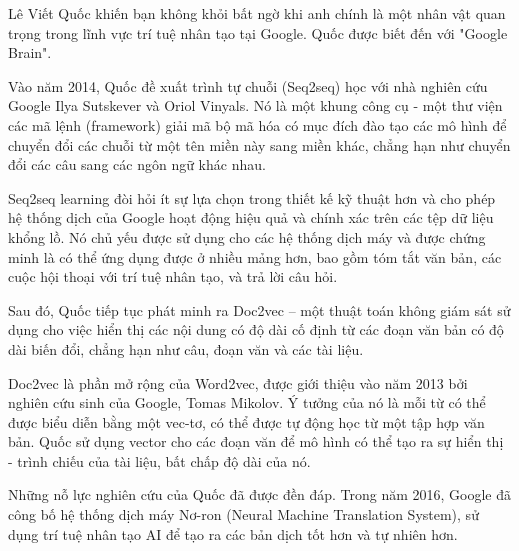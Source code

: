 Lê Viết Quốc khiến bạn không khỏi bất ngờ khi anh chính là một nhân vật quan trọng trong lĩnh vực trí tuệ nhân tạo tại Google. Quốc được biết đến với "Google Brain".

Vào năm 2014, Quốc đề xuất trình tự chuỗi (Seq2seq) học với nhà nghiên cứu Google Ilya Sutskever và Oriol Vinyals. Nó là một khung công cụ - một thư viện các mã lệnh (framework) giải mã bộ mã hóa có mục đích đào tạo các mô hình để chuyển đổi các chuỗi từ một tên miền này sang miền khác, chẳng hạn như chuyển đổi các câu sang các ngôn ngữ khác nhau.

Seq2seq learning đòi hỏi ít sự lựa chọn trong thiết kế kỹ thuật hơn và cho phép hệ thống dịch của Google hoạt động hiệu quả và chính xác trên các tệp dữ liệu khổng lồ. Nó chủ yếu được sử dụng cho các hệ thống dịch máy và được chứng minh là có thể ứng dụng được ở nhiều mảng hơn, bao gồm tóm tắt văn bản, các cuộc hội thoại với trí tuệ nhân tạo, và trả lời câu hỏi.

Sau đó, Quốc tiếp tục phát minh ra Doc2vec – một thuật toán không giám sát sử dụng cho việc hiển thị các nội dung có độ dài cố định từ các đoạn văn bản có độ dài biến đổi, chẳng hạn như câu, đoạn văn và các tài liệu.

Doc2vec là phần mở rộng của Word2vec, được giới thiệu vào năm 2013 bởi nghiên cứu sinh của Google, Tomas Mikolov. Ý tưởng của nó là mỗi từ có thể được biểu diễn bằng một vec-tơ, có thể được tự động học từ một tập hợp văn bản. Quốc sử dụng vector cho các đoạn văn để mô hình có thể tạo ra sự hiển thị - trình chiếu của tài liệu, bất chấp độ dài của nó.

Những nỗ lực nghiên cứu của Quốc đã được đền đáp. Trong năm 2016, Google đã công bố hệ thống dịch máy Nơ-ron (Neural Machine Translation System), sử dụng trí tuệ nhân tạo AI để tạo ra các bản dịch tốt hơn và tự nhiên hơn.